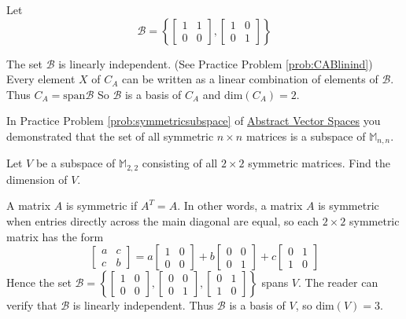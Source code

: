\documentclass{ximera}
\begin{document}
\begin{example}
\begin{explanation}
Let 
$$\mathcal{B}=\left\{\begin{bmatrix}1&1\\0&0\end{bmatrix},\begin{bmatrix}1&0\\0&1\end{bmatrix}\right\}$$

The set $\mathcal{B}$ is linearly independent. (See Practice Problem \ref{prob:CABlinind}) Every element $X$ of $C_A$ can be written as a linear combination of elements of $\mathcal{B}$.  Thus $C_A=\mbox{span}\mathcal{B}$
 So $\mathcal{B}$ is a basis of $C_A$ and $\mbox{dim}(C_A) = 2$.
\end{explanation}
\end{example}

\begin{example}\label{ex:symmetricmatsubspace} 
In Practice Problem \ref{prob:symmetricsubspace} of \href{https://ximera.osu.edu/oerlinalg/LinearAlgebra/VSP-0050/main}{Abstract Vector Spaces} you demonstrated that the set of all symmetric $n\times n$ matrices is a subspace of $\mathbb{M}_{n,n}$.

Let $V$ be a subspace of $\mathbb{M}_{2,2}$ consisting of all $2\times 2$ symmetric matrices.  Find the dimension of $V$.

\begin{explanation}
A matrix $A$ is symmetric if $A^{T} = A$. In other words, a matrix $A$ is symmetric when entries directly across the main diagonal are equal, so each $2 \times 2$ symmetric matrix has the form
$$
\begin{bmatrix}
a & c \\
c & b
\end{bmatrix}
= a\begin{bmatrix}
1 & 0 \\
0 & 0
\end{bmatrix}
+ b\begin{bmatrix}
0 & 0 \\
0 & 1
\end{bmatrix}
+ c\begin{bmatrix}
0 & 1 \\
1 & 0
\end{bmatrix}
$$
Hence the set 
$\mathcal{B} = \left\{
\begin{bmatrix}
1 & 0 \\
0 & 0
\end{bmatrix}, \begin{bmatrix}
0 & 0 \\
0 & 1
\end{bmatrix}, \begin{bmatrix}
0 & 1 \\
1 & 0
\end{bmatrix}
\right\}$
 spans $V$. The reader can verify that $\mathcal{B}$ is linearly independent. Thus $\mathcal{B}$ is a basis of $V$, so $\mbox{dim}(V) = 3$.
\end{explanation}
\end{example}
\end{document}
